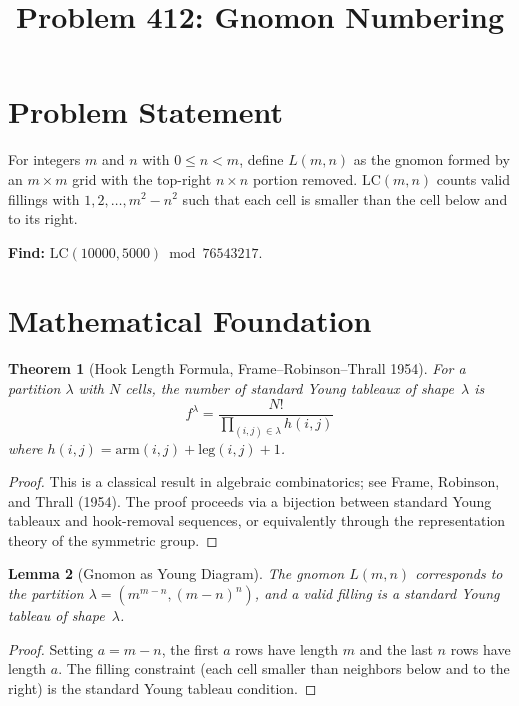 \documentclass[11pt]{article}
\title{Problem 412: Gnomon Numbering}
\author{}
\date{}
\newtheorem{theorem}{Theorem}
\newtheorem{lemma}[theorem]{Lemma}
\newcommand{\LC}{\mathrm{LC}}
\begin{document}
\maketitle

\section{Problem Statement}

For integers $m$ and $n$ with $0 \le n < m$, define $L(m,n)$ as the gnomon formed by an $m \times m$ grid with the top-right $n \times n$ portion removed. $\LC(m,n)$ counts valid fillings with $1, 2, \ldots, m^2 - n^2$ such that each cell is smaller than the cell below and to its right.

\textbf{Find:} $\LC(10000, 5000) \bmod 76543217$.

\section{Mathematical Foundation}

\begin{theorem}[Hook Length Formula, Frame--Robinson--Thrall 1954]
For a partition $\lambda$ with $N$ cells, the number of standard Young tableaux of shape~$\lambda$ is
\[
f^\lambda = \frac{N!}{\displaystyle\prod_{(i,j) \in \lambda} h(i,j)}
\]
where $h(i,j) = \mathrm{arm}(i,j) + \mathrm{leg}(i,j) + 1$.
\end{theorem}

\begin{proof}
This is a classical result in algebraic combinatorics; see Frame, Robinson, and Thrall (1954). The proof proceeds via a bijection between standard Young tableaux and hook-removal sequences, or equivalently through the representation theory of the symmetric group.
\end{proof}

\begin{lemma}[Gnomon as Young Diagram]
The gnomon $L(m,n)$ corresponds to the partition $\lambda = (m^{m-n}, (m-n)^n)$, and a valid filling is a standard Young tableau of shape~$\lambda$.
\end{lemma}

\begin{proof}
Setting $a = m - n$, the first $a$ rows have length $m$ and the last $n$ rows have length $a$. The filling constraint (each cell smaller than neighbors below and to the right) is the standard Young tableau condition.
\end{proof}
\end{document}
